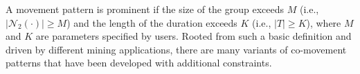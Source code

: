  A movement pattern is prominent if 
the size of the group exceeds $M$ (i.e., $|\mathcal{N}_2(\cdot)| \geq M$) and the length of the duration exceeds $K$ (i.e., $|T| \geq K$), 
where $M$ and $K$ are parameters specified by users. 
Rooted from such a basic definition 
and driven by different mining applications, there are many variants of co-movement patterns that have been developed with additional constraints.

%

%


